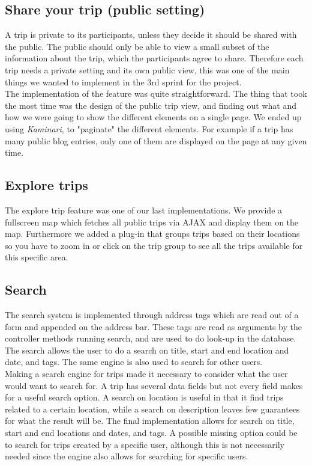 \documentclass[a4paper]{article}
\begin{document}
\subsection{Share your trip (public setting)}
A trip is private to its participants, unless they decide it should be shared with the public. The public should only be able to view a small subset of the information about the trip, which the participants agree to share. Therefore each trip needs a private setting and its own public view, this was one of the main things we wanted to implement in the 3rd sprint for the project. \\

\noindent
The implementation of the feature was quite straightforward. The thing that took the most time was the design of the public trip view, and finding out what and how we were going to show the different elements on a single page. We ended up using \emph{Kaminari}\cite{kaminari}, to "paginate" the different elements. For example if a trip has many public blog entries, only one of them are displayed on the page at any given time. 

\subsection{Explore trips}
The explore trip feature was one of our last implementations. We provide a fullscreen map which fetches all public trips via AJAX and display them on the map. Furthermore we added a plug-in that groups trips based on their locations so you have to zoom in or click on the trip group to see all the trips available for this specific area.

\subsection{Search}
The search system is implemented through address tags which are read out of a form and appended on the address bar. These tags are read as arguments by the controller methods running search, and are used to do look-up in the database. The search allows the user to do a search on title, start and end location and date, and tags. The same engine is also used to search for other users.\\

\noindent
Making a search engine for trips made it necessary to consider what the user would want to search for. A trip has several data fields but not every field makes for a useful search option. A search on location is useful in that it find trips related to a certain location, while a search on description leaves few guarantees for what the result will be. The final implementation allows for search on title, start and end locations and dates, and tags. A possible missing option could be to search for trips created by a specific user, although this is not necessarily needed since the engine also allows for searching for specific users.\\
\end{document}
